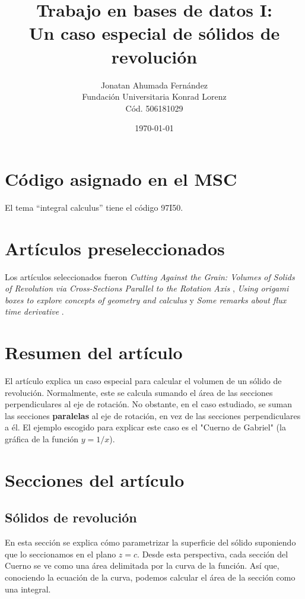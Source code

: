 \documentclass[11pt]{article}
\author{Jonatan Ahumada Fernández\\
Fundación Universitaria Konrad Lorenz\\
Cód. 506181029}
\date{\today}
\title{Trabajo en bases de datos I:\\
Un caso especial de sólidos de revolución}
\begin{document}
\maketitle



\section{Código asignado en el MSC }
\label{sec-1}
El tema “integral calculus” tiene el código 97I50. 


\section{Artículos preseleccionados}
\label{sec-2}
Los artículos seleccionados fueron \emph{Cutting Against the Grain: Volumes of Solids of Revolution via Cross-Sections Parallel to the Rotation Axis} \cite{knudson},
\emph{Using origami boxes to explore concepts of geometry and calculus} \cite{wares} y \emph{Some remarks about flux time derivative} \cite{benedetto}. 

\section{Resumen del artículo}
\label{sec-3}

El artículo explica un caso especial para calcular el volumen de un sólido de revolución.
Normalmente, este se calcula sumando el área de las secciones perpendiculares al 
eje de rotación. No obstante,  en el caso estudiado, se suman las secciones \textbf{paralelas} al eje de rotación, en vez de las secciones 
perpendiculares a él. El ejemplo escogido para explicar este caso es el "Cuerno de Gabriel" (la gráfica 
de la función \(y = 1/x\)).
\section{Secciones del artículo}
\label{sec-4}
\subsection{Sólidos de revolución}
\label{sec-4-1}
En esta sección se explica cómo parametrizar la superficie del sólido suponiendo que 
lo seccionamos en el plano \(z=c\). Desde esta perspectiva, cada sección del Cuerno se ve 
como una área delimitada por la curva de la función. Así que, conociendo la ecuación de la
curva, podemos calcular el área de la sección como una integral. 
\end{document}
